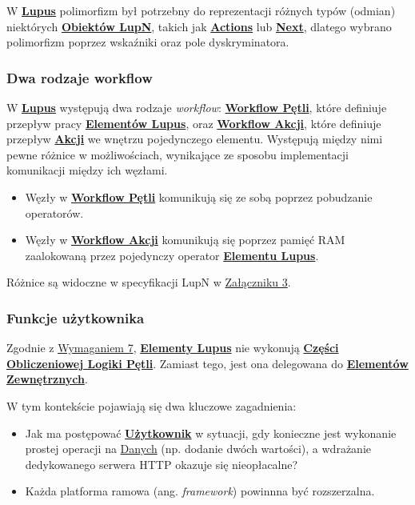 W \hyperlink{def:lupus}{\textbf{Lupus}} polimorfizm był potrzebny do reprezentacji różnych typów (odmian) niektórych \hyperlink{def:element}{\textbf{Obiektów LupN}}, takich jak \hyperlink{def:akcja}{\textbf{Actions}} lub \hyperlink{def:next}{\textbf{Next}}, dlatego wybrano polimorfizm poprzez wskaźniki oraz pole dyskryminatora.

\subsubsection{Dwa rodzaje workflow}\label{sec:dwa-rodzaje-workflow}

W \hyperlink{def:lupus}{\textbf{Lupus}} występują dwa rodzaje \textit{workflow}: \hyperlink{def:workflow-petli}{\textbf{Workflow Pętli}}, które definiuje przepływ pracy \hyperlink{def:element-lupus}{\textbf{Elementów Lupus}}, oraz \hyperlink{def:workflow-petli}{\textbf{Workflow Akcji}}, które definiuje przepływ \hyperlink{def:akcja}{\textbf{Akcji}} we wnętrzu pojedynczego elementu. Występują między nimi pewne różnice w możliwościach, wynikające ze sposobu implementacji komunikacji między ich węzłami.

\begin{itemize}
    \item Węzły w \hyperlink{def:workflow-petli}{\textbf{Workflow Pętli}} komunikują się ze sobą poprzez pobudzanie operatorów.
    \item Węzły w \hyperlink{def:workflow-petli}{\textbf{Workflow Akcji}} komunikują się poprzez pamięć RAM zaalokowaną przez pojedynczy operator \hyperlink{def:element-lupus}{\textbf{Elementu Lupus}}.
\end{itemize}

Różnice są widoczne w specyfikacji LupN w \hyperlink{appendix:3}{Załączniku 3}.

\subsubsection{Funkcje użytkownika}\label{sec:funkcje-uzytkownika}

Zgodnie z \hyperref[req:7]{Wymaganiem 7}, \hyperlink{def:element-lupus}{\textbf{Elementy Lupus}} nie wykonują \hyperlink{def:czesc-obliczeniowa}{\textbf{Części Obliczeniowej Logiki Pętli}}. Zamiast tego, jest ona delegowana do \hyperlink{def:element-zewnetrzny}{\textbf{Elementów Zewnętrznych}}.

W tym kontekście pojawiają się dwa kluczowe zagadnienia:
\begin{itemize}
    \item Jak ma postępować \hyperlink{def:uzytkownik}{\textbf{Użytkownik}} w sytuacji, gdy konieczne jest wykonanie prostej operacji na \hyperlink{def:dane}{Danych} (np. dodanie dwóch wartości), a wdrażanie dedykowanego serwera HTTP okazuje się nieopłacalne?
    \item Każda platforma ramowa (ang. \textit{framework}) powinnna być rozszerzalna.
\end{itemize}

